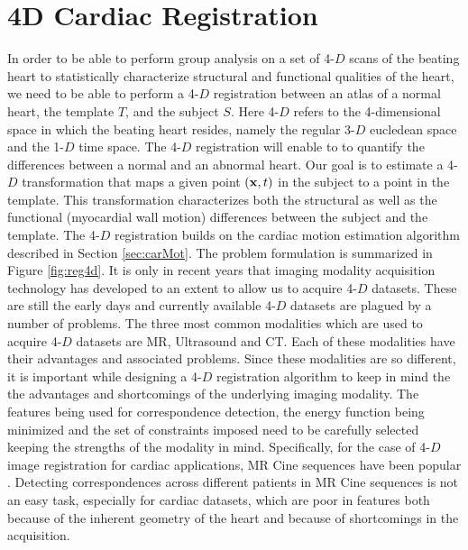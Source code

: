 \section{4D Cardiac Registration}
\label{sec:4dreg}

In order to be able to perform group analysis on a set of 4-$D$ scans of the beating heart to statistically characterize structural and functional qualities of the heart, we need to be able to perform a 4-$D$ registration between an atlas of a normal heart, the template $T$, and the subject $S$. Here 4-$D$ refers to the 4-dimensional space in which the beating heart resides, namely the regular 3-$D$ eucledean space and the 1-$D$ time space. The 4-$D$ registration will enable to to quantify the differences between a normal and an abnormal heart. Our goal is to estimate a 4-$D$ transformation that maps a given point $(\mathbf{x}, t)$ in the subject to a point in the template. This transformation characterizes both the structural as well as the functional (myocardial wall motion) differences between the subject and the template. The 4-$D$ registration builds on the cardiac motion estimation algorithm described in Section \ref{sec:carMot}. The problem formulation is summarized in Figure \ref{fig:reg4d}. It is only in recent years that imaging modality acquisition technology has developed to an extent to allow us to acquire 4-$D$ datasets. These are still the early days and currently available 4-$D$ datasets are plagued by a number of problems. The three most common modalities which are used to acquire 4-$D$ datasets are MR, Ultrasound and CT. Each of these modalities have their advantages and associated problems. 
Since these modalities are so different, it is important while designing a 4-$D$ registration algorithm to keep in mind the the advantages and shortcomings of the underlying imaging modality. The features being used for correspondence detection, the energy function being minimized and the set of constraints imposed need to be carefully selected keeping the strengths of the modality in mind. Specifically, for the case of 4-$D$ image registration for cardiac applications, MR Cine sequences have been popular \cite{perperidis04}. Detecting correspondences across different patients in MR Cine sequences is not an easy task, especially for cardiac datasets, which are poor in features both because of the inherent geometry of the heart and because of shortcomings in the acquisition. 

